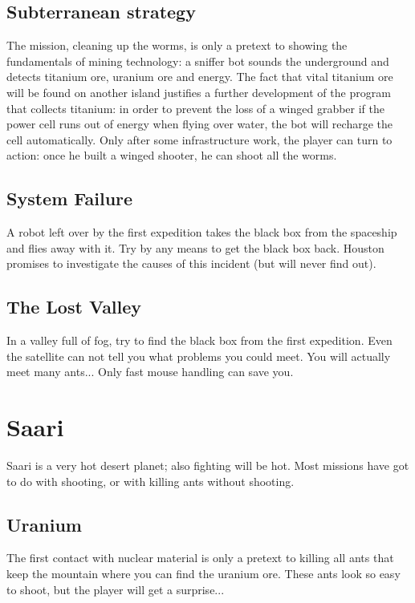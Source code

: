\subsection{Subterranean strategy}

The mission, cleaning up the worms, is only a pretext to showing the fundamentals of mining technology: a sniffer bot sounds the underground and detects titanium ore, uranium ore and energy. The fact that vital titanium ore will be found on another island justifies a further development of the program that collects titanium: in order to prevent the loss of a winged grabber if the power cell runs out of energy when flying over water, the bot will recharge the cell automatically. Only after some infrastructure work, the player can turn to action: once he built a winged shooter, he can shoot all the worms.


\subsection{System Failure}

A robot left over by the first expedition takes the black box from the spaceship and flies away with it. Try by any means to get the black box back. Houston promises to investigate the causes of this incident (but will never find out).


\subsection{The Lost Valley}

In a valley full of fog, try to find the black box from the first expedition. Even the satellite can not tell you what problems you could meet. You will actually meet many ants... Only fast mouse handling can save you.


\section{Saari}

Saari is a very hot desert planet; also fighting will be hot. Most missions have got to do with shooting, or with killing ants without shooting.


\subsection{Uranium}

The first contact with nuclear material is only a pretext to killing all ants that keep the mountain where you can find the uranium ore. These ants look so easy to shoot, but the player will get a surprise...


